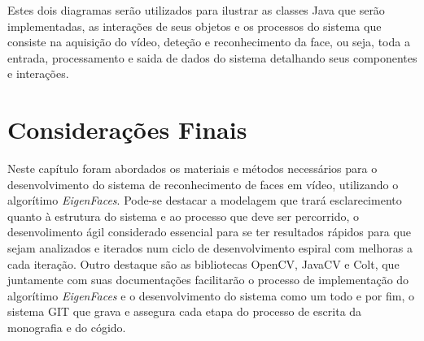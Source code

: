 Estes dois diagramas serão utilizados para ilustrar as classes Java que serão implementadas, as interações de seus objetos e os processos do sistema que consiste na aquisição do vídeo, deteção e reconhecimento da face, ou seja, toda a entrada, processamento e saida de dados do sistema detalhando seus componentes e interações.

\section{Considerações Finais}\label{sec:consfin}
Neste capítulo foram abordados os materiais e métodos necessários para o desenvolvimento do sistema de reconhecimento de faces em vídeo, utilizando o algorítimo \textit{EigenFaces}. Pode-se destacar a modelagem que trará esclarecimento quanto à estrutura do sistema e ao processo que deve ser percorrido, o desenvolimento ágil considerado essencial para se ter resultados rápidos para que sejam analizados e iterados num ciclo de desenvolvimento espiral com melhoras a cada iteração. Outro destaque são as bibliotecas OpenCV, JavaCV e Colt, que juntamente com suas documentações facilitarão o processo de implementação do algorítimo \textit{EigenFaces} e o desenvolvimento do sistema como um todo e por fim, o sistema GIT que grava e assegura cada etapa do processo de escrita da monografia e do cógido.







%





